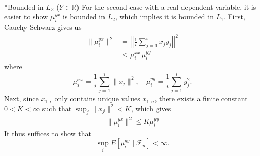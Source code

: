 \documentclass[11pt,a4paper]{article}
\makeatletter
\let\oldparagraph\paragraph
\renewcommand{\paragraph}{
    \@ifstar
      \xxxParagraphStar
      \xxxParagraphNoStar
  }
\newcommand{\xxxParagraphStar}[1]{\oldparagraph*{#1}\mbox{}}
\newcommand{\xxxParagraphNoStar}[1]{\oldparagraph{#1}\mbox{}}
\theoremstyle{plain}
\theoremstyle{remark}
\theoremstyle{remark}
\makeatother
\begin{document}
\paragraph*{Bounded in $L_2$ ($Y \in \mathbb{R}$)}
For the second case with a real dependent variable, it is easier to show $\mu_i^{yx}$ is bounded in $L_2$, which implies it is bounded in $L_1$. First, Cauchy-Schwarz gives us 
\begin{align*}
    \|\mu_{i}^{yx}\|^2 &=  \left|\left|\frac{1}{i}\sum_{j = 1}^i x_j y_j\right|\right|^2 \\
    &\leq \mu_i^{xx}\, \mu_i^{yy}
\end{align*}
where
$$
\mu_i^{xx} = \frac{1}{i}\sum_{j = 1}^i \|x_j\|^2, \quad \mu_i^{yy} = \frac{1}{i}\sum_{j = 1}^i y_j^2.
$$
Next, since $x_{1:i}$ only contains unique values $x_{1:n}$, there exists a finite constant $0 < K < \infty$ such that $\sup_j \|x_j\|^2 < K$, which gives
\begin{align*}
    \|\mu_i^{yx}\|^2 \leq K \mu_i^{yy}
\end{align*}
It thus suffices to show that
$$
\sup_i E\left[ \mu_i^{yy} \mid \mathcal{F}_n \right] < \infty.
$$
\end{document}
